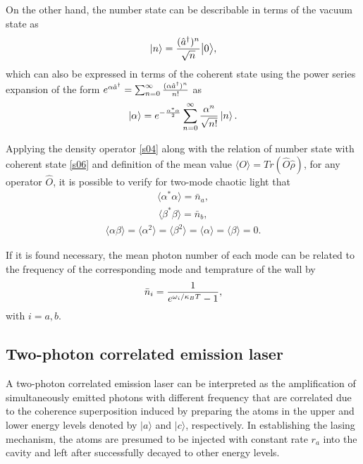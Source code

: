 \documentclass[twocolumn,showpacs,preprintnumbers,amsmath,amssymb,pra]{revtex4}
\begin{document}
On the other hand, the number state can be describable in terms of the vacuum state as
\begin{align}\label{s05}|n\rangle={(\hat{a}^{\dagger})^{n}\over\sqrt{n}}\big|0\big\rangle,\end{align} which can also be expressed in terms of the coherent state
using the power series expansion of the form $e^{\alpha\hat{a}^{\dagger}}=\sum_{n=0}^{\infty}{(\alpha\hat{a}^{\dagger})^{n}\over n!}$ as
\begin{align}\label{s06}|\alpha\rangle=e^{-{\alpha^{*}\alpha\over2}}\sum_{n=0}^{\infty}{\alpha^{n}\over\sqrt{n!}}\left|n\right\rangle.\end{align}

Applying the density operator \eqref{s04} along with the relation of number state with coherent state \eqref{s06} and definition of the mean value  $\langle O\rangle=Tr(\hat{O}\hat{\rho})$, for any operator $\hat{O}$, it is possible to verify for two-mode chaotic light that
\begin{align}\label{s07}\langle\alpha^{*}\alpha\rangle=\bar{n}_{a},\end{align}
\begin{align}\label{s08}\langle\beta^{*}\beta\rangle=\bar{n}_{b},\end{align}
\begin{align}\label{s09}\langle\alpha\beta\rangle=\langle\alpha^{2}\rangle=\langle\beta^{2}\rangle=\langle\alpha\rangle=\langle\beta\rangle=0.\end{align}  

If it is found necessary, the mean photon number of each mode can be related to the frequency of the corresponding mode and temprature of the wall by 
\begin{align}\label{s10}\bar{n}_{i}={1\over e^{\omega_{i}/\kappa_{B} T}-1},\end{align} with $i=a,b$.


\subsection{Two-photon correlated emission laser}

A two-photon correlated emission laser can be interpreted as the amplification of simultaneously emitted photons with different frequency that are correlated due to the coherence superposition induced by preparing the atoms in the upper  and lower energy levels denoted by $|a\rangle$ and $|c\rangle$, respectively. In establishing the lasing mechanism, the atoms are presumed to be injected with constant rate $r_{a}$ into the cavity and left after successfully decayed to other energy levels. 
\end{document}
